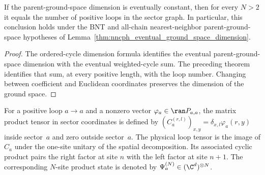 \begin{lemma}
    \label{cor:beigi_parent_ground_space_loop_number}
    \leanok
    If the parent-ground-space dimension is eventually constant, then for
    every $N>2$ it equals the number of positive loops in the sector graph.
    In particular, this conclusion holds under the BNT and all-chain
    nearest-neighbor parent-ground-space hypotheses of
    Lemma~\ref{thm:nncph_eventual_ground_space_dimension}.
\end{lemma}

\begin{proof}\leanok
    The ordered-cycle dimension formula identifies the eventual
    parent-ground-space dimension with the eventual weighted-cycle sum.
    The preceding theorem identifies that sum, at every positive length, with
    the loop number. Changing between coefficient and Euclidean coordinates
    preserves the dimension of the ground space.
\end{proof}

\begin{definition}
    \label{def:beigi_loop_product_state}
    \leanok
    For a positive loop $a\to a$ and a nonzero vector
    $\varphi_a\in\ran P_{a,a}$, the matrix product tensor in sector coordinates
    is defined by $(C_a^{(r,l)})_{x,y}=\delta_{x,l}\varphi_a(r,y)$ inside
    sector~$a$ and zero outside sector~$a$. The physical loop tensor is the
    image of $C_a$ under the one-site unitary of the spatial decomposition.
    Its associated cyclic product pairs the right factor at site $n$ with the
    left factor at site $n+1$. The corresponding $N$-site product state is
    denoted by $\Psi_a^{(N)}\in(\C^d)^{\otimes N}$.
\end{definition}

